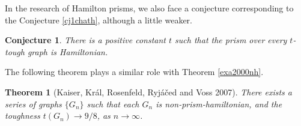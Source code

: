 \documentclass[12pt]{report}
\newtheorem{theorem}{Theorem}
\newtheorem{conjecture}{Conjecture}
\begin{document}
In the research of Hamilton prisms, we also face a conjecture corresponding to the Conjecture \ref{cj1chath}, although a little weaker.

\begin{conjecture}\label{cjttph}
There is a positive constant $t$ such that the prism over every $t$-tough graph is Hamiltonian.
\end{conjecture}

The following theorem plays a similar role with Theorem \ref{exa2000nh}.

\begin{theorem}[Kaiser, Kr{\'a}l, Rosenfeld, Ryj{\'a}{\v c}ed and Voss 2007]\label{98tgnhpex}
There exists a series of graphs $\{G_n\}$ such that each $G_n$ is non-prism-hamiltonian, and the toughness $t(G_n)\rightarrow9/8$, as $n\rightarrow\infty$.
\end{theorem}
\end{document}
